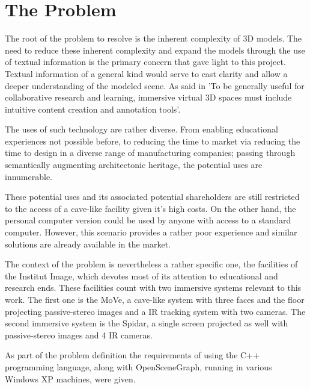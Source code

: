 \section{The Problem}
The root of the problem to resolve is the inherent complexity of 3D models. The need to reduce these inherent complexity and expand the models through the use of textual information is the primary concern that gave light to this project. Textual information of a general kind would serve to cast clarity and allow a deeper understanding of the modeled scene. As said in \cite{Kadobayashi} 'To be generally useful for collaborative research and learning, immersive virtual 3D spaces must include intuitive content creation and annotation tools'.

The uses of such technology are rather diverse. From enabling educational experiences not possible before, to reducing the time to market via reducing the time to design in a diverse range of manufacturing companies; passing through semantically augmenting architectonic heritage, the potential uses are innumerable.

These potential uses and its associated potential shareholders are still restricted to the access of a cave-like facility given it's high costs. On the other hand, the personal computer version could be used by anyone with access to a standard computer. However, this scenario provides a rather poor experience and similar solutions are already available in the market.

The context of the problem is nevertheless a rather specific one, the facilities of the Institut Image, which devotes most of its attention to educational and research ends. These facilities count with two immersive systems relevant to this work. The first one is the MoVe, a cave-like system with three faces and the floor projecting passive-stereo  images and a IR tracking system with two cameras. The second immersive system is the Spidar, a single screen projected as well with passive-stereo images and 4 IR cameras. 

As part of the problem definition the requirements of using the C++ programming language, along with OpenSceneGraph, running in various Windows XP machines, were given.
